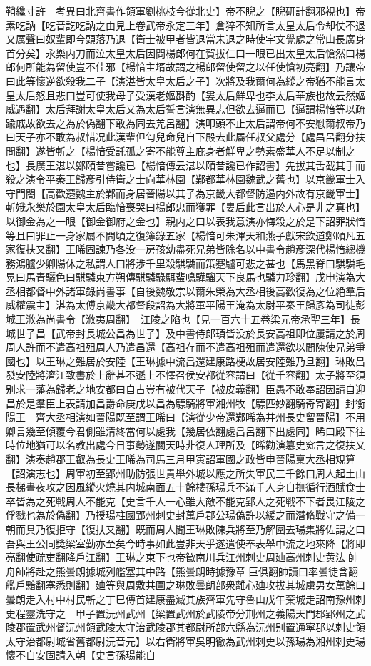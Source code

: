 鞘纔寸許　考異曰北齊書作領軍劉桃枝今從北史】帝不睨之【睨研計翻邪視也】帝素吃訥【吃音訖吃訥之由見上卷武帝永定三年】倉猝不知所言太皇太后令却仗不退又厲聲曰奴輩即今頭落乃退【衛士被甲者皆退當未退之時使宇文覺處之常山長廣身首分矣】永樂内刀而泣太皇太后因問楊郎何在賀拔仁曰一眼已出太皇太后愴然曰楊郎何所能為留使豈不佳邪【楊愔主壻故謂之楊郎留使留之以任使愴初亮翻】乃讓帝曰此等懷逆欲殺我二子【演湛皆太皇太后之子】次將及我爾何為縱之帝猶不能言太皇太后怒且悲曰豈可使我母子受漢老嫗斟酌【婁太后鮮卑也李太后華族也故云然嫗威遇翻】太后拜謝太皇太后又為太后誓言演無異志但欲去逼而已【逼謂楊愔等以疏踰戚故欲去之為於偽翻下敢為同去羌呂翻】演叩頭不止太后謂帝何不安慰爾叔帝乃曰天子亦不敢為叔惜况此漢輩但匄兒命兒自下殿去此屬任叔父處分【處昌呂翻分扶問翻】遂皆斬之【楊愔受託孤之寄不能尊主庇身者鮮卑之勢素盛華人不足以制之也】長廣王湛以鄭頤昔嘗讒已【楊愔傳云湛以頤昔讒已作詔書】先拔其舌截其手而殺之演令平秦王歸彥引侍衛之士向華林園【鄴都華林園魏武之舊也】以京畿軍士入守門閤【高歡遷魏主於鄴而身居晉陽以其子為京畿大都督防遏内外故有京畿軍士】斬娥永樂於園太皇太后臨愔喪哭曰楊郎忠而獲罪【婁后此言出於人心是非之真也】以御金為之一眼【御金御府之金也】親内之曰以表我意演亦悔殺之於是下詔罪狀愔等且曰罪止一身家屬不問頃之復簿錄五家【楊愔可朱渾天和燕子獻宋欽道鄭頤凡五家復扶又翻】王晞固諫乃各没一房孩幼盡死兄弟皆除名以中書令趙彥深代楊愔總機務鴻臚少卿陽休之私謂人曰將涉千里殺騏驎而策蹇驢可悲之甚也【馬黑脊曰騏驎毛晃曰馬青驪色曰騏驎東方朔傳騏驎騄駬蜚鳴驊騮天下良馬也驎力珍翻】戊申演為大丞相都督中外諸軍錄尚書事【自後魏敬宗以爾朱榮為大丞相後高歡復為之位絶羣后威權震主】湛為太傅京畿大都督段韶為大將軍平陽王淹為太尉平秦王歸彥為司徒彭城王浟為尚書令【浟夷周翻】　江陵之陷也【見一百六十五卷梁元帝承聖三年】長城世子昌【武帝封長城公昌為世子】及中書侍郎頊皆没於長安高祖即位屢請之於周周人許而不遣高祖殂周人乃遣昌還【高祖存而不遣高祖殂而遣還欲以間陳使兄弟爭國也】以王琳之難居於安陸【王琳據中流昌還建康路梗故居安陸難乃旦翻】琳敗昌發安陸將濟江致書於上辭甚不遜上不懌召侯安都從容謂曰【從千容翻】太子將至須别求一藩為歸老之地安都曰自古豈有被代天子【被皮義翻】臣愚不敢奉詔因請自迎昌於是羣臣上表請加昌爵命庚戌以昌為驃騎將軍湘州牧【驃匹妙翻騎奇寄翻】封衡陽王　齊大丞相演如晉陽既至謂王晞曰【演從少帝還鄴晞為并州長史留晉陽】不用卿言幾至傾覆今君側雖清終當何以處我【幾居依翻處昌呂翻下出處同】晞曰殿下往時位地猶可以名教出處今日事勢遂關天時非復人理所及【晞勸演簒史䆒言之復扶又翻】演奏趙郡王叡為長史王晞為司馬三月甲寅詔軍國之政皆申晉陽稟大丞相䂓算【詔演志也】周軍初至郢州助防張世貴舉外城以應之所失軍民三千餘口周人起土山長梯晝夜攻之因風縱火燒其内城南面五十餘樓孫瑒兵不滿千人身自撫循行酒賦食士卒皆為之死戰周人不能克【史言千人一心雖大敵不能克郢人之死戰不下者畏江陵之俘戮也為於偽翻】乃授瑒柱國郢州刺史封萬戶郡公瑒偽許以緩之而潛脩戰守之備一朝而具乃復拒守【復扶又翻】既而周人聞王琳敗陳兵將至乃解圍去瑒集將佐謂之曰吾與王公同奬梁室勤亦至矣今時事如此豈非天乎遂遣使奉表舉中流之地來降【將即亮翻使疏吏翻降戶江翻】王琳之東下也帝徵南川兵江州刺史周廸高州刺史黄法帥舟師將赴之熊曇朗據城列艦塞其中路【熊曇朗時據豫章巨俱翻帥讀曰率曇徒含翻艦戶黯翻塞悉則翻】廸等與周敷共圍之琳敗曇朗部衆離心廸攻拔其城虜男女萬餘口曇朗走入村中村民斬之丁巳傳首建康盡滅其族齊軍先守魯山戊午棄城走詔南豫州刺史程靈洗守之　甲子置沅州武州【梁置武州於武陵帝分荆州之義陽天門郡郢州之武陵郡置武州督沅州領武陵太守治武陵郡其都尉所部六縣為沅州别置通寜郡以刺史領太守治都尉城省舊都尉沅音元】以右衛將軍吳明徹為武州刺史以孫瑒為湘州刺史瑒懷不自安固請入朝【史言孫瑒能自